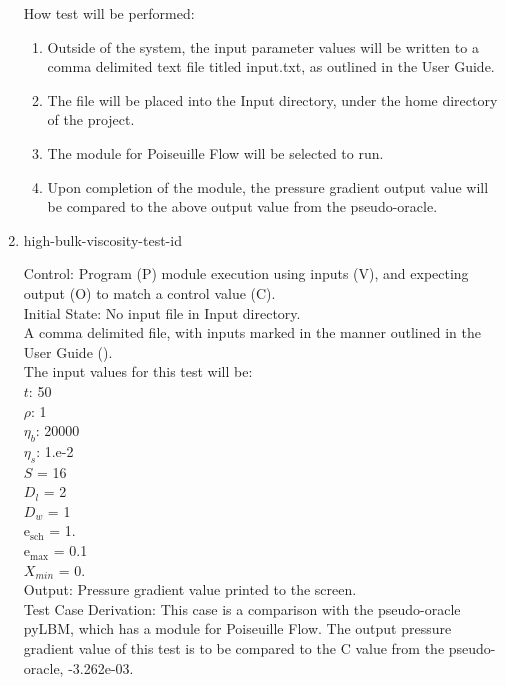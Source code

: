 \documentclass[12pt, titlepage]{article}
\newcounter{testcounter} %
\begin{document}
\begin{enumerate}
How test will be performed: 

\begin{enumerate}
\item Outside of the system, the input parameter values will be written to a
comma delimited text file titled input.txt, as outlined in the User Guide.
\item The file will be placed into the Input directory, under the home directory
of the project.
\item The module for Poiseuille Flow will be selected to run.
\item Upon completion of the module, the pressure gradient output value will be
compared to the above output value from the pseudo-oracle.
\end{enumerate}	

\item{high-bulk-viscosity-test-id\thetestcounter \\}

Control: Program (P) module execution using inputs (V), and expecting output (O) to match a control value (C).\\
					
Initial State: No input file in Input directory.\\
					
A comma delimited file, with inputs marked in the manner outlined in the User
Guide (\citet{LBM_UserGuide_PM}).\\The input values for this test will be:\\
$t$: 50\\
$\rho$: 1\\
$\eta_b$: 20000\\
$\eta_s$: 1.e-2\\
$S$ = 16\\
$D_{l}$ = 2\\
$D_{w}$ = 1\\
$\mathrm{e_{sch}}$ = 1.\\
$\mathrm{e_{max}}$ = 0.1\\
$X_{min}$ = 0.\\

Output: Pressure gradient value printed to the screen.  \\

Test Case Derivation: This case is a comparison with the pseudo-oracle pyLBM,
which has a module for Poiseuille Flow. The output pressure gradient value of
this test is to be compared to the C value from the pseudo-oracle,
-3.262e-03.\


\end{enumerate}
\end{document}
